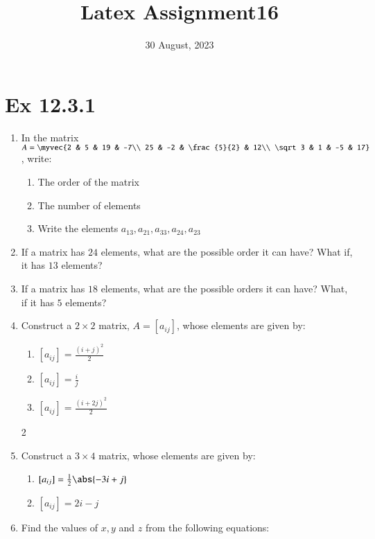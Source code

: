 \documentclass{article}
\theoremstyle{remark}
\begin{document}
\title{Latex Assignment16}
\date{30 August, 2023}
\maketitle
\section*{Ex 12.3.1}
\begin{enumerate}
\item In the matrix $A=\myvec
{2 & 5 & 19 & -7\\
25 & -2 & \frac{5}{2} & 12\\
\sqrt 3 & 1 & -5 & 17}$, write:
\begin{enumerate}[label=(\roman*)]
\item The order of the matrix
\item The number of elements
\item Write the elements $a_{13}, a_{21}, a_{33}, a_{24}, a_{23}$
\end{enumerate}
\item If a matrix has $24$ elements, what are the possible order it can have? What if, it has $13$ elements?
\item If a matrix has $18$ elements, what are the possible orders it can have? What, if it has $5$ elements?
\item Construct a $2\times 2$ matrix, $A=[a_{ij}]$, whose elements are given by:
\begin{enumerate}[label=(\roman*)]
\item $[a_{ij}]=\frac{(i+j)^2}{2}$
\item $[a_{ij}]=\frac{i}{j}$
\item $[a_{ij}]=\frac{(i+2j)^2}{2}$
\end{enumerate}
2\item Construct a $3\times 4$ matrix, whose elements are given by:
\begin{enumerate}[label=(\roman*)]
\item $[a_{ij}]=\frac{1}{2}\abs{-3i+j}$
\item $[a_{ij}]=2i-j$
\end{enumerate}
\item Find the values of $x, y$ and $z$ from the following equations:
\end{enumerate}
\end{document}
